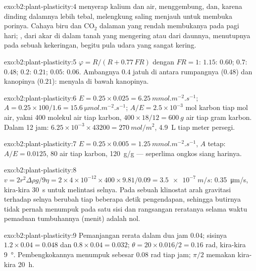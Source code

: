 \begin{solution}{exo:b2:plant-plasticity:4}
 menyerap kalium dan air, menggembung, dan, karena
dinding dalamnya lebih tebal, melengkung saling menjauh untuk membuka
porinya. Cahaya biru dan $\mathrm{CO_2}$ dalaman yang rendah membukanya
pada pagi hari; , dari akar di dalam tanah yang mengering
atau dari daunnya, menutupnya pada sebuah kekeringan, begitu pula udara
yang sangat kering.
\end{solution}

\begin{solution}{exo:b2:plant-plasticity:5}
$\varphi = R/(R + 0.77\,FR)$ dengan $FR = 1$: $1.15$: $0.60$; $0.7$:
$0.48$; $0.2$: $0.21$; $0.05$: $0.06$. Ambangnya $0.4$ jatuh di antara
rumpangnya ($0.48$) dan kanopinya ($0.21$): 
menyala di bawah kanopinya.
\end{solution}

\begin{solution}{exo:b2:plant-plasticity:6}
$E = 0.25\times 0.025 = \qty{6.25}{mmol.m^{-2}.s^{-1}}$; $A =
0.25\times 100/1.6 = \qty{15.6}{\micro mol.m^{-2}.s^{-1}}$; $A/E =
2.5\times 10^{-3}$ mol karbon tiap mol air, yakni 400 molekul air tiap
karbon, $400\times 18/12 = \qty{600}{g}$ air tiap gram karbon. Dalam 12
jam: $6.25\times 10^{-3}\times 43200 =
\qty{270}{mol/m^2}$,
\qty{4.9}{L} tiap meter persegi.
\end{solution}

\begin{solution}{exo:b2:plant-plasticity:7}
$E = 0.25\times 0.005 = \qty{1.25}{mmol.m^{-2}.s^{-1}}$, $A$ tetap:
$A/E = 0.0125$, 80 air tiap karbon, \qty{120}{g/g} --- seperlima ongkos
siang harinya.
\end{solution}

\begin{solution}{exo:b2:plant-plasticity:8}
$v = 2r^{2}\Delta\rho g/9\eta = 2\times 4\times 10^{-12}\times
400\times 9.81/0.09 = \qty{3.5e-7}{m/s}$: \qty{0.35}{\micro m/s},
kira-kira \qty{30}{s} untuk melintasi selnya. Pada sebuah klinostat
arah gravitasi terhadap selnya berubah tiap beberapa detik pengendapan,
sehingga butirnya tidak pernah menumpuk pada satu sisi dan rangsangan
reratanya selama waktu pemaduan tumbuhannya (menit) adalah nol.
\end{solution}

\begin{solution}{exo:b2:plant-plasticity:9}
Pemanjangan rerata dalam dua jam $0.04$; sisinya $1.2\times 0.04 = 0.048$ dan $0.8\times 0.04 = 0.032$; $\theta = 20\times 0.016/2 = 0.16$
rad, kira-kira \qty{9}{\degree}. Pembengkokannya menumpuk sebesar
$0.08$ rad tiap jam; $\pi/2$ memakan kira-kira \qty{20}{h}.
\end{solution}

